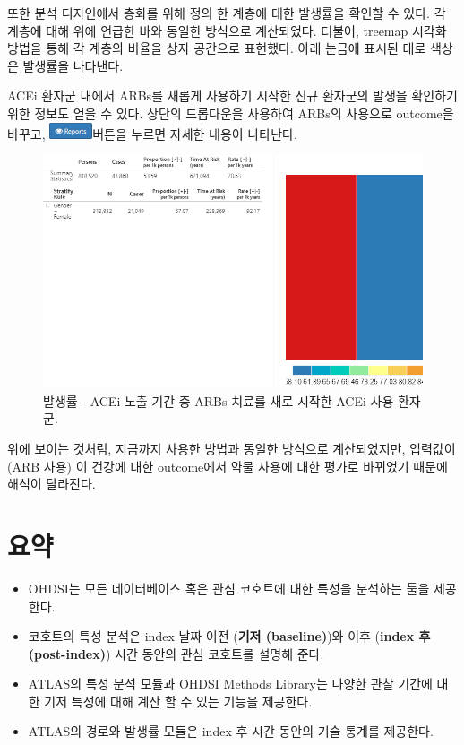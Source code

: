 \documentclass[11pt]{book}
\theoremstyle{definition}
\theoremstyle{definition}
\theoremstyle{definition}
\theoremstyle{remark}
\let\BeginKnitrBlock\begin \let\EndKnitrBlock\end
\begin{document}
또한 분석 디자인에서 층화를 위해 정의 한 계층에 대한 발생률을 확인할 수
있다. 각 계층에 대해 위에 언급한 바와 동일한 방식으로 계산되었다.
더불어, treemap 시각화 방법을 통해 각 계층의 비율을 상자 공간으로
표현했다. 아래 눈금에 표시된 대로 색상은 발생률을 나타낸다.

ACEi 환자군 내에서 ARBs를 새롭게 사용하기 시작한 신규 환자군의 발생을
확인하기 위한 정보도 얻을 수 있다. 상단의 드롭다운을 사용하여 ARBs의
사용으로 outcome을 바꾸고,
\includegraphics{images/Characterization/atlasIncidenceReportButton.png}버튼을
누르면 자세한 내용이 나타난다.

\begin{figure}

{\centering \includegraphics[width=1\linewidth]{images/Characterization/atlasIncidenceResultsARB} 

}

\caption{발생률 - ACEi 노출 기간 중 ARBs 치료를 새로 시작한 ACEi 사용 환자군.}\label{fig:atlasIncidenceResultsARB}
\end{figure}

위에 보이는 것처럼, 지금까지 사용한 방법과 동일한 방식으로 계산되었지만,
입력값이 (ARB 사용) 이 건강에 대한 outcome에서 약물 사용에 대한 평가로
바뀌었기 때문에 해석이 달라진다.

\section{요약}\label{-9}

\BeginKnitrBlock{rmdsummary}
\begin{itemize}
\item
  OHDSI는 모든 데이터베이스 혹은 관심 코호트에 대한 특성을 분석하는 툴을
  제공한다.
\item
  코호트의 특성 분석은 index 날짜 이전 (\textbf{기저 (baseline)})와 이후
  (\textbf{index 후 (post-index)}) 시간 동안의 관심 코호트를 설명해
  준다.
\item
  ATLAS의 특성 분석 모듈과 OHDSI Methods Library는 다양한 관찰 기간에
  대한 기저 특성에 대해 계산 할 수 있는 기능을 제공한다.
\item
  ATLAS의 경로와 발생률 모듈은 index 후 시간 동안의 기술 통계를
  제공한다.
\end{itemize}
\EndKnitrBlock{rmdsummary}
\end{document}
